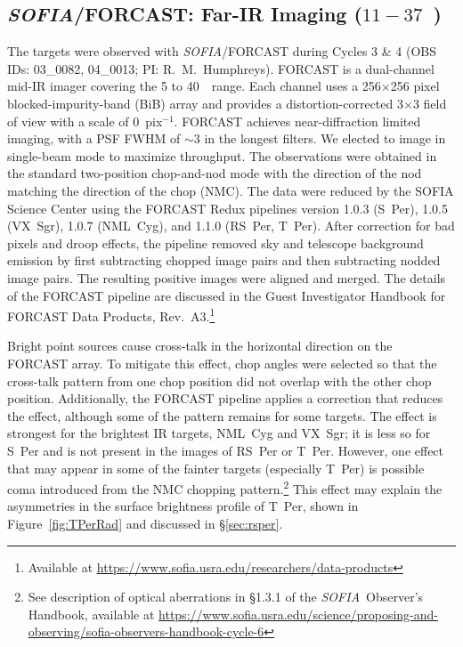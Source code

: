 \documentclass[modern]{aastex61}
\newcommand{\SOFIA}{{\it SOFIA}}
\begin{document}
\subsection{\SOFIA/FORCAST: Far-IR Imaging ($11-37$~\micron)}\label{sec:imaging}
The targets were observed with \SOFIA/FORCAST during Cycles 3 \& 4 (OBS IDs: 03\_0082, 04\_0013; PI: R.~M.~Humphreys).  FORCAST is a dual-channel mid-IR imager covering the 5 to 40~\micron\ range.  Each channel uses a 256$\times$256 pixel blocked-impurity-band (BiB) array and provides a distortion-corrected 3$\times$3 field of view with a scale of 0~pix$^{-1}$.  FORCAST achieves near-diffraction limited imaging, with a PSF FWHM of $\sim$3 in the longest filters.  We elected to image in single-beam mode to maximize throughput.  The observations were obtained  in the standard two-position chop-and-nod mode with the direction of the nod matching the direction of the chop (NMC).  The data were reduced by the SOFIA Science Center using the FORCAST Redux pipelines version 1.0.3 (S~Per), 1.0.5 (VX~Sgr), 1.0.7 (NML~Cyg), and 1.1.0 (RS~Per, T~Per).  After correction for bad pixels and droop effects, the pipeline removed sky and telescope background emission by first subtracting chopped image pairs and then subtracting nodded image pairs.  The resulting positive images were aligned and merged.  The details of the FORCAST pipeline are discussed in the Guest Investigator Handbook for FORCAST Data Products, Rev.\ A3.\footnote{\footnotesize{Available at \url{https://www.sofia.usra.edu/researchers/data-products}}}

Bright point sources cause cross-talk in the horizontal direction on the FORCAST array.  To mitigate this effect, chop angles were selected so that the cross-talk pattern from one chop position did not overlap with the other chop position.  Additionally, the FORCAST pipeline applies a correction that reduces the effect, although some of the pattern remains for some targets.  The effect is strongest for the brightest IR targets, NML~Cyg and VX~Sgr; it is less so for S~Per and is not present in the images of RS~Per or T~Per.   However, one effect that may appear in some of the fainter targets (especially T~Per) is possible coma introduced from the NMC chopping pattern.\footnote{\footnotesize{See description of optical aberrations in \S1.3.1 of the \SOFIA\ Observer's Handbook, available at \url{https://www.sofia.usra.edu/science/proposing-and-observing/sofia-observers-handbook-cycle-6}}}  This effect may explain the asymmetries in the surface brightness profile of T~Per, shown in Figure~\ref{fig:TPerRad} and discussed in \S\ref{sec:rsper}.
\end{document}
